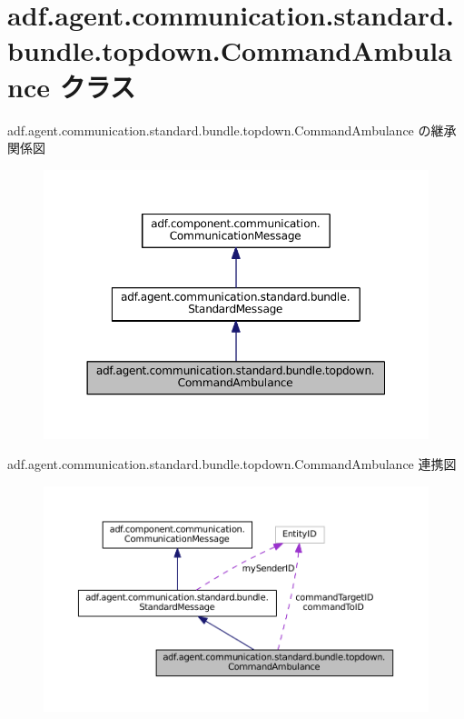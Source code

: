 \hypertarget{classadf_1_1agent_1_1communication_1_1standard_1_1bundle_1_1topdown_1_1CommandAmbulance}{}\section{adf.\+agent.\+communication.\+standard.\+bundle.\+topdown.\+Command\+Ambulance クラス}
\label{classadf_1_1agent_1_1communication_1_1standard_1_1bundle_1_1topdown_1_1CommandAmbulance}


adf.\+agent.\+communication.\+standard.\+bundle.\+topdown.\+Command\+Ambulance の継承関係図
\nopagebreak
\begin{figure}[H]
\begin{center}
\leavevmode
\includegraphics[width=350pt]{classadf_1_1agent_1_1communication_1_1standard_1_1bundle_1_1topdown_1_1CommandAmbulance__inherit__graph}
\end{center}
\end{figure}


adf.\+agent.\+communication.\+standard.\+bundle.\+topdown.\+Command\+Ambulance 連携図
\nopagebreak
\begin{figure}[H]
\begin{center}
\leavevmode
\includegraphics[width=350pt]{classadf_1_1agent_1_1communication_1_1standard_1_1bundle_1_1topdown_1_1CommandAmbulance__coll__graph}
\end{center}
\end{figure}
